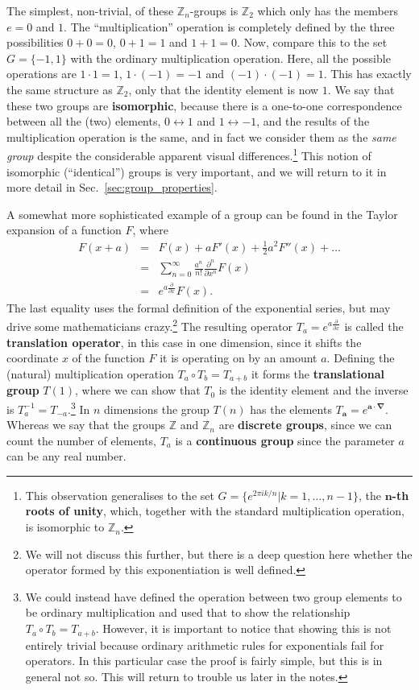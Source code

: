\documentclass[notes.tex]{subfiles}
\begin{document}
The simplest, non-trivial, of these $\mathbb{Z}_n$-groups is $\mathbb{Z}_2$ which only has the members $e=0$ and $1$. The ``multiplication'' operation is completely defined by the three possibilities $0+0=0$, $0+1=1$ and $1+1=0$. Now, compare this to the set $G=\{-1,1\}$ with the ordinary multiplication operation. Here, all the possible operations are $1\cdot 1=1$, $1\cdot (-1)=-1$ and $(-1)\cdot (-1)=1$. This has exactly the same structure as $\mathbb{Z}_2$, only that the identity element is now $1$.  We say that these two groups are {\bf isomorphic}, because there is a one-to-one correspondence between all the (two) elements, $0\leftrightarrow 1$ and $1\leftrightarrow -1$, and the results of the multiplication operation is the same, and in fact we consider them as the {\it same group} despite the considerable apparent visual differences.\footnote{This observation  generalises to the set $G=\{e^{2\pi ik/n} | k=1,\ldots,n-1\}$, the {\bf $\mathbf n$-th roots of unity}, which, together with the standard multiplication operation, is isomorphic to  $\mathbb{Z}_n$.} 
This notion of isomorphic (``identical'') groups is very important, and we will return to it in more detail in Sec.~\ref{sec:group_properties}.

A somewhat more sophisticated example of a group can be found in the Taylor expansion of a function $F$, where
\begin{eqnarray*}
F(x+a) &=& F(x) + aF'(x) + \frac{1}{2} a^2 F''(x) + \ldots \\
&=& \sum_{n=0}^{\infty}\frac{a^n}{n!}\frac{\partial^n}{\partial x^n} F(x)\\
&=& e^{a\frac{\partial}{\partial x}} F(x).
\end{eqnarray*}
The last equality uses the formal definition of the exponential series, but may drive some mathematicians crazy.\footnote{We will not discuss this further, but there is a deep question here whether the operator formed by this exponentiation is well defined.}  The resulting operator $T_a = e^{a\frac{\partial}{\partial x}} $ is called the {\bf translation operator}, in this case in one dimension, since it shifts the coordinate $x$ of the function $F$ it is operating on by an amount $a$. Defining the (natural) multiplication operation
$T_a \circ T_b = T_{a+b}$
it forms the {\bf translational group} $T(1)$, where we can show that $T_0$ is the identity element and the inverse is $T_a^{-1} = T_{-a}$.\footnote{We could instead have defined the operation between two group elements to be ordinary multiplication and used that to show the relationship $T_a \circ T_b = T_{a+b}$. However, it is important to notice that showing this is not entirely trivial because ordinary arithmetic rules for exponentials fail for operators. In this particular case the proof is fairly simple, but this is in general not so. This will return to trouble us later in the notes.} In $n$ dimensions the group $T(n)$ has the elements  $T_{\mathbf{a}} = e^{\mathbf{a}\cdot \mathbf{\nabla}}$. Whereas we say that the groups $\mathbb{Z}$ and $\mathbb{Z}_n$ are {\bf discrete groups}, since we can count the number of elements, $T_a$ is a {\bf continuous group} since the parameter $a$ can be any real number. 
\end{document}
